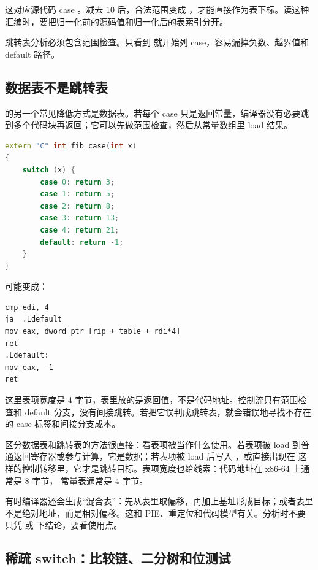 这对应源代码 case 。减去 10 后，合法范围变成 ，才能直接作为表下标。读这种汇编时，要把归一化前的源码值和归一化后的表索引分开。

\begin{warningbox}
跳转表分析必须包含范围检查。只看到  就开始列 case，容易漏掉负数、越界值和 default 路径。
\end{warningbox}

\subsection{数据表不是跳转表}

 的另一个常见降低方式是数据表。若每个 case 只是返回常量，编译器没有必要跳到多个代码块再返回；它可以先做范围检查，然后从常量数组里 load 结果。

\begin{lstlisting}[language=C++]
extern "C" int fib_case(int x)
{
    switch (x) {
        case 0: return 3;
        case 1: return 5;
        case 2: return 8;
        case 3: return 13;
        case 4: return 21;
        default: return -1;
    }
}
\end{lstlisting}

可能变成：

\begin{lstlisting}
cmp edi, 4
ja  .Ldefault
mov eax, dword ptr [rip + table + rdi*4]
ret
.Ldefault:
mov eax, -1
ret
\end{lstlisting}

这里表项宽度是 4 字节，表里放的是返回值，不是代码地址。控制流只有范围检查和 default 分支，没有间接跳转。若把它误判成跳转表，就会错误地寻找不存在的 case 标签和间接分支成本。

区分数据表和跳转表的方法很直接：看表项被当作什么使用。若表项被 load 到普通返回寄存器或参与计算，它是数据；若表项被 load 后写入 ，或直接出现在  这样的控制转移里，它才是跳转目标。表项宽度也给线索：代码地址在 x86-64 上通常是 8 字节， 常量表通常是 4 字节。

有时编译器还会生成“混合表”：先从表里取偏移，再加上基址形成目标；或者表里不是绝对地址，而是相对偏移。这和 PIE、重定位和代码模型有关。分析时不要只凭  或  下结论，要看使用点。

\subsection{稀疏 switch：比较链、二分树和位测试}

